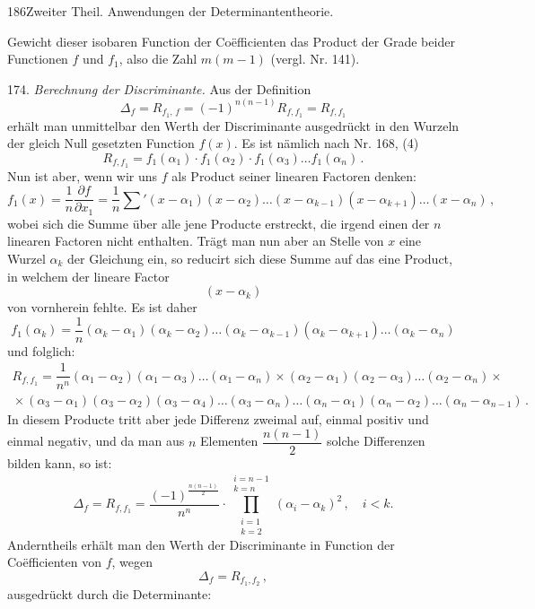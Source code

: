 \documentclass[11pt]{article}
\providecommand{\weberpage}[1]{}
\providecommand{\weq}[2]{\begin{equation}\tag{#1}#2\end{equation}}
\let\Delta\varDelta
\begin{document}
\weberpage{186}
186\quad Zweiter Theil. Anwendungen der Determinantentheorie.

Gewicht dieser isobaren Function der Co\"efficienten das Product der
Grade beider Functionen $f$ und $f_1$, also die Zahl $m(m-1)$ (vergl.
Nr. 141).

174. \textit{Berechnung der Discriminante.} Aus der Definition
\[
\Delta_f = R_{f_1,\,f} = (-1)^{n(n-1)}R_{f,f_1} = R_{f,f_1}
\]
erhält man unmittelbar den Werth der Discriminante ausgedrückt in
den Wurzeln der gleich Null gesetzten Function $f(x)$. Es ist nämlich
nach Nr. 168, (4)
\[
R_{f,f_1} = f_1(\alpha_1)\cdot f_1(\alpha_2)\cdot f_1(\alpha_3)\ldots f_1(\alpha_n)\,.
\]
Nun ist aber, wenn wir uns $f$ als Product seiner linearen Factoren
denken:
\[
f_1(x) = \frac{1}{n}\frac{\partial f}{\partial x_1}
= \frac{1}{n}\sum{}'(x-\alpha_1)(x-\alpha_2)\ldots(x-\alpha_{k-1})(x-\alpha_{k+1})\ldots(x-\alpha_n)\,,
\]
wobei sich die Summe über alle jene Producte erstreckt, die irgend
einen der $n$ linearen Factoren nicht enthalten. Trägt man nun aber
an Stelle von $x$ eine Wurzel $\alpha_k$ der Gleichung ein, so reducirt sich
diese Summe auf das eine Product, in welchem der lineare Factor
\[
(x - \alpha_k)
\]
von vornherein fehlte. Es ist daher
\[
f_1(\alpha_k) = \frac{1}{n}(\alpha_k-\alpha_1)(\alpha_k-\alpha_2)\ldots(\alpha_k-\alpha_{k-1})(\alpha_k-\alpha_{k+1})\ldots(\alpha_k-\alpha_n)
\]
und folglich:
\[
\begin{gathered}
R_{f,f_1} = \dfrac{1}{n^n}(\alpha_1-\alpha_2)(\alpha_1-\alpha_3)\ldots(\alpha_1-\alpha_n)\times(\alpha_2-\alpha_1)(\alpha_2-\alpha_3)\ldots(\alpha_2-\alpha_n)\times{}\\
{}\times(\alpha_3-\alpha_1)(\alpha_3-\alpha_2)(\alpha_3-\alpha_4)\ldots(\alpha_3-\alpha_n)\ldots(\alpha_n-\alpha_1)(\alpha_n-\alpha_2)\ldots(\alpha_n-\alpha_{n-1})\,.
\end{gathered}
\]
In diesem Producte tritt aber jede Differenz zweimal auf, einmal
positiv und einmal negativ, und da man aus $n$ Elementen $\dfrac{n(n-1)}{2}$
solche Differenzen bilden kann, so ist:
\weq{I}{\Delta_f = R_{f,f_1} = \dfrac{(-1)^{\frac{n(n-1)}{2}}}{n^n}\cdot\prod_{\substack{i=1\\k=2}}^{\substack{i=n-1\\k=n}}(\alpha_i-\alpha_k)^2\,,\quad i<k.}
Anderntheils erhält man den Werth der Discriminante in Function
der Co\"efficienten von $f$, wegen
\[
\Delta_f = R_{f_1,f_2}\,,
\]
ausgedrückt durch die Determinante:
\end{document}
